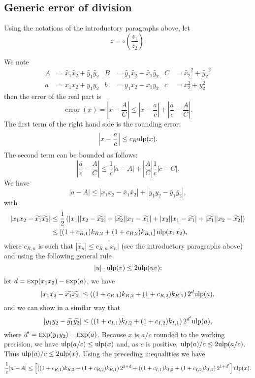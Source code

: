 \documentclass {article}
\newcommand {\Ulp}{{\rm ulp}}
\DeclareMathOperator{\error}{error}
\DeclareMathOperator{\Exp}{{\rm \textsc exp}}
\begin{document}
\subsection {Generic error of division}\label{generic:div}

Using the notations of the introductory paragraphs above, let
\[
z=\circ(\frac{z_1}{z_2}).
\]

We note
\begin{align*}
A&=\widetilde{x_1}\widetilde{x_2}+\widetilde{y_1}\widetilde{y_2}&
B&=\widetilde{y_1}\widetilde{x_2}-\widetilde{x_1}\widetilde{y_2}&
C&=\widetilde{x_2}^2+\widetilde{y_2}^2\\
a&=x_1x_2+y_1y_2&
b&=y_1x_2-x_1y_2&
c&=x_2^2+y_2^2
\end{align*}
then the error of the real part is
\[
\error(x) = \left|x-\frac{A}{C}\right| \leq \left|x-\frac{a}{c}\right| +
\left|\frac{a}{c}-\frac{A}{C}\right|.
\]
The first term of the right hand side is the rounding error:
\[
\left|x-\frac{a}{c}\right|\leq c_R \Ulp(x).
\]
The second term can be bounded as follows:
\[
\left|\frac{a}{c}-\frac{A}{C}\right| \leq \frac{1}{c} |a-A|
+\left|\frac{A}{C}\right|\frac{1}{c}|c-C|.
\]
We have
\[
|a-A| \leq |x_1x_2-\widetilde{x_1}\widetilde{x_2}|
+|y_1y_2-\widetilde{y_1}\widetilde{y_2}|,
\]
with
\begin{align*}
|x_1x_2-\widetilde{x_1}\widetilde{x_2}| &\leq \frac{1}{2} \left(
|x_1||x_2-\widetilde{x_2}|+|\widetilde{x_2}||x_1-\widetilde{x_1}|
+|x_2||x_1-\widetilde{x_1}|+|\widetilde{x_1}||x_2-\widetilde{x_2}| \right)\\
&\leq \left[ (1+c_{R,1})k_{R,2}+(1+c_{R,2})k_{R,1} \right] \Ulp(x_1x_2),
\end{align*}
where $c_{R,n}$ is such that $|\widetilde{x_n}| \leq c_{R,n} |x_n|$ (see the
introductory paragraphs above) and using the following general rule
\[
|u|\cdot\Ulp(v) \leq 2\Ulp(uv);
\]
let $d=\Exp(x_1x_2)-\Exp(a)$, we have
\[
|x_1x_2-\widetilde{x_1}\widetilde{x_2}| \leq
\left((1+c_{R,1})k_{R,2}+(1+c_{R,2})k_{R,1}\right)2^d \Ulp(a),
\]
and we can show in a similar way that
\[
|y_1y_2-\widetilde{y_1}\widetilde{y_2}| \leq \left( (1+c_{I,1})k_{I,2}
+(1+c_{I,2})k_{I,1} \right)2^{d'} \Ulp(a),
\]
where $d'=\Exp(y_1y_2)-\Exp(a)$. Because $x$ is $a/c$ rounded to the working
precision, we have $\Ulp(a/c) \leq \Ulp(x)$ and, as $c$ is positive,
$\Ulp(a)/c \leq 2\Ulp(a/c)$. Thus $\Ulp(a)/c \leq 2\Ulp(x)$. Using the
preceding inequalities we have
\[
\frac{1}{c}|a-A| \leq \left[
\left((1+c_{R,1})k_{R,2}+(1+c_{R,2})k_{R,1}\right)2^{1+d}
+\left((1+c_{I,1})k_{I,2}+(1+c_{I,2})k_{I,1}\right)2^{1+d'}
\right] \Ulp(x).
\]
\end{document}
